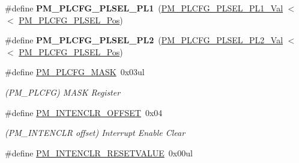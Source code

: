 \begin{DoxyCompactItemize}
\item 
\hypertarget{group___s_a_m_l21___p_m_gabacb97aac037ca2c5ef0fe1ff90784eb}{}\#define {\bfseries P\+M\+\_\+\+P\+L\+C\+F\+G\+\_\+\+P\+L\+S\+E\+L\+\_\+\+P\+L1}~(\hyperlink{group___s_a_m_l21___p_m_ga0897f81e64cd9cbea06e3e2a21dfb160}{P\+M\+\_\+\+P\+L\+C\+F\+G\+\_\+\+P\+L\+S\+E\+L\+\_\+\+P\+L1\+\_\+\+Val}        $<$$<$ \hyperlink{group___s_a_m_l21___p_m_ga693b3d1b5761b829a93e9c14809abea8}{P\+M\+\_\+\+P\+L\+C\+F\+G\+\_\+\+P\+L\+S\+E\+L\+\_\+\+Pos})\label{group___s_a_m_l21___p_m_gabacb97aac037ca2c5ef0fe1ff90784eb}

\item 
\hypertarget{group___s_a_m_l21___p_m_gae76e935b9c5552060242511dadee6443}{}\#define {\bfseries P\+M\+\_\+\+P\+L\+C\+F\+G\+\_\+\+P\+L\+S\+E\+L\+\_\+\+P\+L2}~(\hyperlink{group___s_a_m_l21___p_m_ga0434b913fd9da073c4d090b9196e9752}{P\+M\+\_\+\+P\+L\+C\+F\+G\+\_\+\+P\+L\+S\+E\+L\+\_\+\+P\+L2\+\_\+\+Val}        $<$$<$ \hyperlink{group___s_a_m_l21___p_m_ga693b3d1b5761b829a93e9c14809abea8}{P\+M\+\_\+\+P\+L\+C\+F\+G\+\_\+\+P\+L\+S\+E\+L\+\_\+\+Pos})\label{group___s_a_m_l21___p_m_gae76e935b9c5552060242511dadee6443}

\item 
\hypertarget{group___s_a_m_l21___p_m_gadfb319f0faca48fa4336911644f5ccac}{}\#define \hyperlink{group___s_a_m_l21___p_m_gadfb319f0faca48fa4336911644f5ccac}{P\+M\+\_\+\+P\+L\+C\+F\+G\+\_\+\+M\+A\+S\+K}~0x03ul\label{group___s_a_m_l21___p_m_gadfb319f0faca48fa4336911644f5ccac}

\begin{DoxyCompactList}\small\item\em (P\+M\+\_\+\+P\+L\+C\+F\+G) M\+A\+S\+K Register \end{DoxyCompactList}\item 
\hypertarget{group___s_a_m_l21___p_m_ga96e613f029988a0e97e71761daab56d8}{}\#define \hyperlink{group___s_a_m_l21___p_m_ga96e613f029988a0e97e71761daab56d8}{P\+M\+\_\+\+I\+N\+T\+E\+N\+C\+L\+R\+\_\+\+O\+F\+F\+S\+E\+T}~0x04\label{group___s_a_m_l21___p_m_ga96e613f029988a0e97e71761daab56d8}

\begin{DoxyCompactList}\small\item\em (P\+M\+\_\+\+I\+N\+T\+E\+N\+C\+L\+R offset) Interrupt Enable Clear \end{DoxyCompactList}\item 
\hypertarget{group___s_a_m_l21___p_m_ga6af1e46f631f08562f2affcba415c69c}{}\#define \hyperlink{group___s_a_m_l21___p_m_ga6af1e46f631f08562f2affcba415c69c}{P\+M\+\_\+\+I\+N\+T\+E\+N\+C\+L\+R\+\_\+\+R\+E\+S\+E\+T\+V\+A\+L\+U\+E}~0x00ul\label{group___s_a_m_l21___p_m_ga6af1e46f631f08562f2affcba415c69c}


\end{DoxyCompactItemize}
